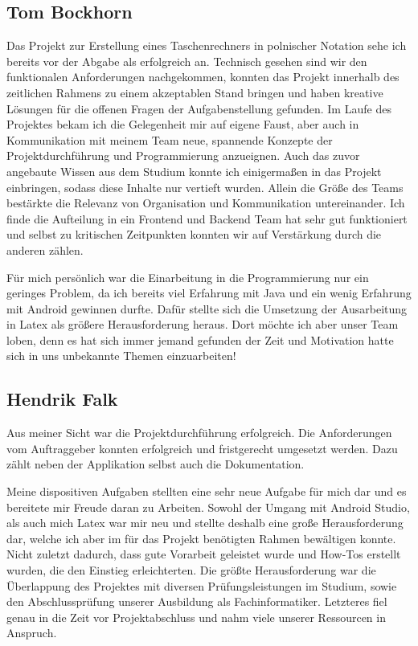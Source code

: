 \subsection{Tom Bockhorn}
Das Projekt zur Erstellung eines Taschenrechners in polnischer Notation sehe ich bereits vor der Abgabe als erfolgreich an. Technisch gesehen sind wir den funktionalen Anforderungen nachgekommen, konnten das Projekt innerhalb des zeitlichen Rahmens zu einem akzeptablen Stand bringen und haben kreative Lösungen für die offenen Fragen der Aufgabenstellung gefunden. Im Laufe des Projektes bekam ich die Gelegenheit mir auf eigene Faust, aber auch in Kommunikation mit meinem Team neue, spannende Konzepte der Projektdurchführung und Programmierung anzueignen. Auch das zuvor angebaute Wissen aus dem Studium konnte ich einigermaßen in das Projekt einbringen, sodass diese Inhalte nur vertieft wurden. Allein die Größe des Teams bestärkte die Relevanz von Organisation und Kommunikation untereinander. Ich finde die Aufteilung in ein Frontend und Backend Team hat sehr gut funktioniert und selbst zu kritischen Zeitpunkten konnten wir auf Verstärkung durch die anderen zählen.

Für mich persönlich war die Einarbeitung in die Programmierung nur ein geringes Problem, da ich bereits viel Erfahrung mit Java und ein wenig Erfahrung mit Android gewinnen durfte. Dafür stellte sich die Umsetzung der Ausarbeitung in Latex als größere Herausforderung heraus. Dort möchte ich aber unser Team loben, denn es hat sich immer jemand gefunden der Zeit und Motivation hatte sich in uns unbekannte Themen einzuarbeiten!


\subsection{Hendrik Falk}
Aus meiner Sicht war die Projektdurchführung erfolgreich. Die Anforderungen vom Auftraggeber konnten erfolgreich und fristgerecht umgesetzt werden. Dazu zählt neben der Applikation selbst auch die Dokumentation. 

Meine dispositiven Aufgaben stellten eine sehr neue Aufgabe für mich dar und es bereitete mir Freude daran zu Arbeiten. Sowohl der Umgang mit Android Studio, als auch mich Latex war mir neu und stellte deshalb eine große Herausforderung dar, welche ich aber im für das Projekt benötigten Rahmen bewältigen konnte. Nicht zuletzt dadurch, dass gute Vorarbeit geleistet wurde und How-Tos erstellt wurden, die den Einstieg erleichterten. Die größte Herausforderung war die Überlappung des Projektes mit diversen Prüfungsleistungen im Studium, sowie den Abschlussprüfung unserer Ausbildung als Fachinformatiker. Letzteres fiel genau in die Zeit vor Projektabschluss und nahm viele unserer Ressourcen in Anspruch. 

